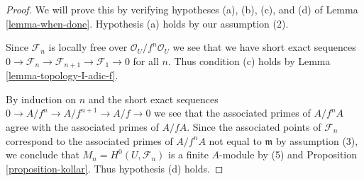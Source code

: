 \begin{proof}
We will prove this by verifying hypotheses (a), (b), (c), and (d) of
Lemma \ref{lemma-when-done}. Hypothesis (a) holds by our assumption (2).

\medskip\noindent
Since $\mathcal{F}_n$ is locally free over $\mathcal{O}_U/f^n\mathcal{O}_U$
we see that we have short exact sequences
$0 \to \mathcal{F}_n \to \mathcal{F}_{n + 1} \to \mathcal{F}_1 \to 0$
for all $n$. Thus condition (c) holds by Lemma \ref{lemma-topology-I-adic-f}.

\medskip\noindent
By induction on $n$ and the short exact sequences
$0 \to A/f^n \to A/f^{n + 1} \to A/f \to 0$ we see that
the associated primes of $A/f^nA$ agree with the associated
primes of $A/fA$. Since the associated points of $\mathcal{F}_n$
correspond to the associated primes of $A/f^nA$ not equal to $\mathfrak m$
by assumption (3), we conclude that
$M_n = H^0(U, \mathcal{F}_n)$ is a finite $A$-module by (5) and
Proposition \ref{proposition-kollar}. Thus hypothesis (d) holds.


\end{proof}
